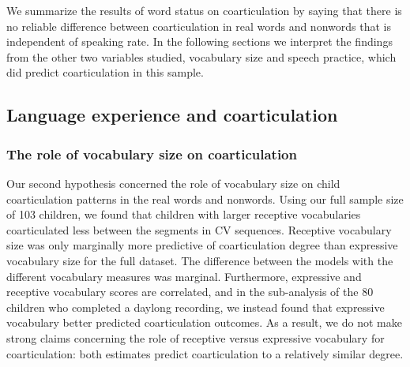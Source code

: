 \documentclass[a4paper,man,natbib,donotrepeattitle, apacite]{apa6}
\begin{document}
We summarize the results of word status on coarticulation by saying that there is no reliable difference between coarticulation in real words and nonwords that is independent of speaking rate. In the following sections we interpret the findings from the other two variables studied, vocabulary size and speech practice, which did predict coarticulation in this sample. 

\subsection{Language experience and coarticulation}

\subsubsection{The role of vocabulary size on coarticulation}

Our second hypothesis concerned the role of vocabulary size on child coarticulation patterns in the real words and nonwords. Using our full sample size of 103 children, we found that children with larger receptive vocabularies coarticulated less between the segments in CV sequences. Receptive vocabulary size was only marginally more predictive of coarticulation degree than expressive vocabulary size for the full dataset. The difference between the models with the different vocabulary measures was marginal. Furthermore, expressive and receptive vocabulary scores are correlated, and in the sub-analysis of the 80 children who completed a daylong recording, we instead found that expressive vocabulary better predicted coarticulation outcomes. As a result, we do not make strong claims concerning the role of receptive versus expressive vocabulary for coarticulation: both estimates predict coarticulation to a relatively similar degree.
\end{document}
